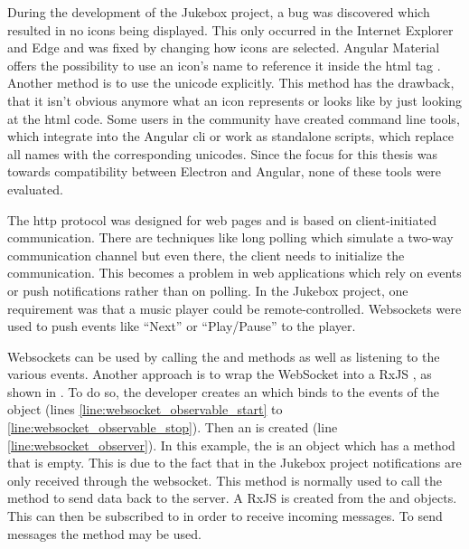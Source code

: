 During the development of the Jukebox project, a bug was discovered which resulted in no icons being displayed. This only occurred in the Internet Explorer and Edge and was fixed by changing how icons are selected. Angular Material offers the possibility to use an icon's name to reference it inside the \gls{html} tag \zB {}. Another method is to use the unicode explicitly. This method has the drawback, that it isn't obvious anymore what an icon represents or looks like by just looking at the \gls{html} code. Some users in the community have created command line tools, which integrate into the Angular \gls{cli} or work as standalone scripts, which replace all names with the corresponding unicodes. Since the focus for this thesis was towards compatibility between Electron and Angular, none of these tools were evaluated. \cite{materialIcons}



The \gls{http} protocol was designed for web pages and is based on client-initiated communication. There are techniques like long polling which simulate a two-way communication channel but even there, the client needs to initialize the communication. This becomes a problem in web applications which rely on events or push notifications rather than on polling. In the Jukebox project, one requirement was that a music player could be remote-controlled. Websockets were used to push events like \enquote{Next} or \enquote{Play/Pause} to the player.


Websockets can be used by calling the  and  methods as well as listening to the various events. Another approach is to wrap the WebSocket into a RxJS , as shown in  \cite{rxjs} \cite{js_websockets}. To do so, the developer creates an  which binds to the events of the  object (lines \ref{line:websocket_observable_start} to \ref{line:websocket_observable_stop}). Then an  is created (line \ref{line:websocket_observer}). In this example, the  is an object which has a  method that is empty. This is due to the fact that in the Jukebox project notifications are only received through the websocket. This  method is normally used to call the  method to send data back to the server. A RxJS  is created from the  and  objects. This  can then be subscribed to in order to receive incoming messages. To send messages the  method may be used.
